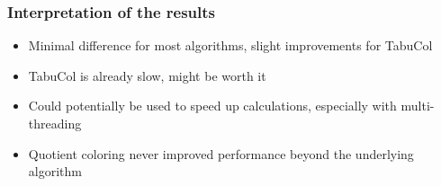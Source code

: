 \documentclass[11pt]{beamer}
\begin{document}
\begin{frame}
    \frametitle{Interpretation of the results}
    \begin{itemize}
        \item Minimal difference for most algorithms, slight improvements for TabuCol
        \item TabuCol is already slow, might be worth it
        \item Could potentially be used to speed up calculations, especially with multi-threading
        \item Quotient coloring never improved performance beyond the underlying algorithm
    \end{itemize}
\end{frame}
\end{document}
